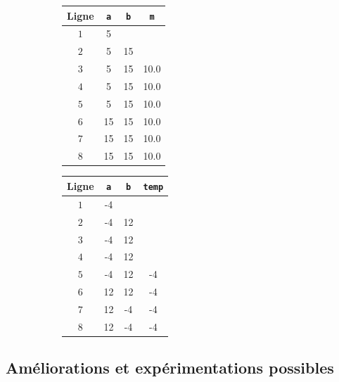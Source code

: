 \def\arraystretch{1}
\setlength\tabcolsep{5pt}
\begin{figure}[h]
\begin{subfigure}{.245\textwidth}
	\begin{tabular}{|c|c|c|c|}\hline
		Ligne & \texttt{a} & \texttt{b} & \texttt{m} \\ \hline
		$1$ &5&& \\ \hline
		$2$ &5&15& \\ \hline
		$3$ &5&15&10.0 \\ \hline
		$4$ &5&15&10.0 \\ \hline
		$5$ &5&15&10.0 \\ \hline
		$6$ &15&15&10.0 \\ \hline
		$7$ &15&15&10.0 \\ \hline
		$8$ &15&15&10.0 \\ \hline
	\end{tabular}
\end{subfigure}
\begin{subfigure}{.24\textwidth}
\vspace{14pt}
\end{subfigure}
\begin{subfigure}{.26\textwidth}
	\begin{tabular}{|c|c|c|c|}\hline
		Ligne & \texttt{a} & \texttt{b} & \texttt{temp} \\ \hline
		$1$ &-4&& \\ \hline
		$2$ &-4&12& \\ \hline
		$3$ &-4&12& \\ \hline
		$4$ &-4&12& \\ \hline
		$5$ &-4&12&-4 \\ \hline
		$6$ &12&12&-4 \\ \hline
		$7$ &12&-4&-4 \\ \hline
		$8$ &12&-4&-4 \\ \hline
	\end{tabular}
\end{subfigure}
\begin{subfigure}{.24\textwidth}
\vspace{15pt}
\end{subfigure}
\end{figure}

\subsection*{Améliorations et expérimentations possibles}

